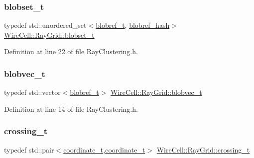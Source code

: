 \subsubsection{\texorpdfstring{blobset\+\_\+t}{blobset\_t}}
{\footnotesize\ttfamily typedef std\+::unordered\+\_\+set$<$\hyperlink{namespace_wire_cell_1_1_ray_grid_abed76699c704f53d6c4ce912da18050b}{blobref\+\_\+t}, \hyperlink{struct_wire_cell_1_1_ray_grid_1_1blobref__hash}{blobref\+\_\+hash}$>$ \hyperlink{namespace_wire_cell_1_1_ray_grid_a3610973c19231cca55e15d0a8055e079}{Wire\+Cell\+::\+Ray\+Grid\+::blobset\+\_\+t}}



Definition at line 22 of file Ray\+Clustering.\+h.

\mbox{\label{namespace_wire_cell_1_1_ray_grid_a3154c64db4d07056418dfcd1afbf0531}} 
\subsubsection{\texorpdfstring{blobvec\+\_\+t}{blobvec\_t}}
{\footnotesize\ttfamily typedef std\+::vector$<$\hyperlink{namespace_wire_cell_1_1_ray_grid_abed76699c704f53d6c4ce912da18050b}{blobref\+\_\+t}$>$ \hyperlink{namespace_wire_cell_1_1_ray_grid_a3154c64db4d07056418dfcd1afbf0531}{Wire\+Cell\+::\+Ray\+Grid\+::blobvec\+\_\+t}}



Definition at line 14 of file Ray\+Clustering.\+h.

\mbox{\label{namespace_wire_cell_1_1_ray_grid_ad8870c962588c4492b1f7c5ad1552a7e}} 
\subsubsection{\texorpdfstring{crossing\+\_\+t}{crossing\_t}}
{\footnotesize\ttfamily typedef std\+::pair$<$\hyperlink{struct_wire_cell_1_1_ray_grid_1_1coordinate__t}{coordinate\+\_\+t},\hyperlink{struct_wire_cell_1_1_ray_grid_1_1coordinate__t}{coordinate\+\_\+t}$>$ \hyperlink{namespace_wire_cell_1_1_ray_grid_ad8870c962588c4492b1f7c5ad1552a7e}{Wire\+Cell\+::\+Ray\+Grid\+::crossing\+\_\+t}}



